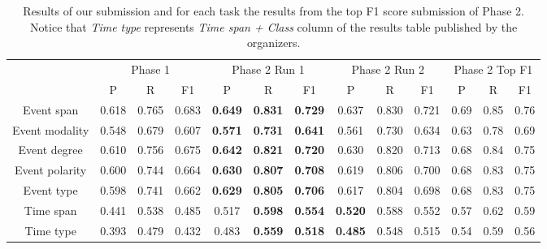 \documentclass[11pt,a4paper]{article}
\begin{document}
\begin{table*}
\footnotesize
\centering
\begin{tabular}{|c|ccc|ccc|ccc|ccc|}
\hline
& \multicolumn{3}{c|}{Phase 1} & \multicolumn{3}{c|}{Phase 2 Run 1} & \multicolumn{3}{c|}{Phase 2 Run 2} & \multicolumn{3}{c|}{Phase 2 Top F1} \\
& P & R & F1 & P & R & F1 & P & R & F1 & P & R & F1 \\
\hline
Event span & 0.618 & 0.765 & 0.683 & \textbf{0.649} & \textbf{0.831} & \textbf{0.729} & 0.637 & 0.830 & 0.721 & 0.69 & 0.85 & 0.76\\
Event modality & 0.548 & 0.679 & 0.607 & \textbf{0.571} & \textbf{0.731} & \textbf{0.641} & 0.561 & 0.730 & 0.634  & 0.63	 & 0.78  & 0.69\\
Event degree & 0.610 & 0.756 & 0.675 & \textbf{0.642} & \textbf{0.821} & \textbf{0.720} & 0.630 & 0.820 & 0.713 & 0.68 & 	0.84 &  0.75\\
Event polarity & 0.600 & 0.744 & 0.664 & \textbf{0.630} & \textbf{0.807} & \textbf{0.708} & 0.619 & 0.806 & 0.700  & 0.68	 & 0.83 &  0.75\\	
Event type & 0.598 & 0.741 & 0.662 & \textbf{0.629} & \textbf{0.805} & \textbf{0.706} & 0.617 & 0.804 & 0.698 & 0.68	 & 0.83  & 0.75 \\	
\hline
Time span & 0.441 & 0.538 & 0.485 & 0.517 & \textbf{0.598} & \textbf{0.554} & \textbf{0.520} & 0.588 & 0.552  & 0.57 & 	0.62  & 0.59	\\
Time type & 0.393 & 0.479 & 0.432 & 0.483 & \textbf{0.559} & \textbf{0.518} & \textbf{0.485} & 0.548 & 0.515  & 0.54 & 	0.59 &  0.56\\	
\hline\end{tabular}
\caption{Results of our submission and for each task the results from the top F1 score submission of Phase 2.
Notice that \emph{Time type} represents \emph{Time span + Class} column of the results table published by the organizers.} 
\label{table:results}
\end{table*}

\end{document}
